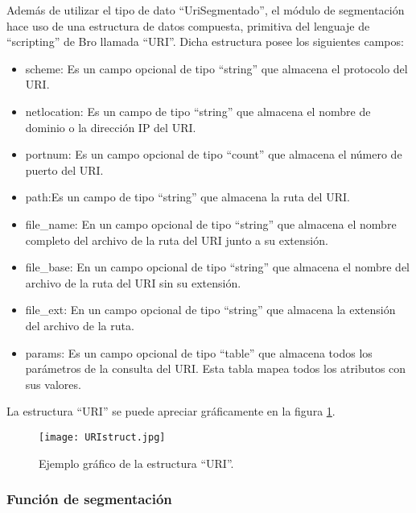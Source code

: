 Además de utilizar el tipo de dato ``UriSegmentado'', el módulo de segmentación hace uso de una estructura de datos compuesta, primitiva del lenguaje de ``scripting'' de Bro llamada  ``URI''. Dicha estructura posee los siguientes campos:

\begin{itemize}
\item scheme: Es un campo opcional de tipo ``string'' que almacena el protocolo del URI.

\item netlocation: Es un campo de tipo ``string'' que almacena el nombre de dominio o la dirección IP del URI.

\item portnum: Es un campo opcional de tipo ``count''  que almacena el número de puerto del URI.
\item path:Es un campo de tipo ``string'' que almacena la ruta del URI.

\item file\_name: En un campo opcional de tipo ``string'' que almacena el nombre completo  del archivo de la ruta del URI junto a su extensión.

\item file\_base: En un campo opcional de tipo ``string'' que almacena el nombre  del archivo de la ruta del URI sin su extensión.

\item file\_ext: En un campo opcional de tipo ``string'' que almacena la extensión del archivo de la ruta.

\item params: Es un campo opcional de tipo ``table'' que almacena todos los parámetros de la consulta del URI. Esta tabla mapea todos los atributos con sus valores.

\end{itemize}

La estructura ``URI'' se puede apreciar gráficamente en la figura \ref{fig:URI}.

\begin{figure}[tb]
\begin{center}
\texttt{[image: URIstruct.jpg]}
\caption{Ejemplo gráfico de la estructura ``URI''.}
\label{fig:URI}
\end{center}
\end{figure}	

\subsubsection{Función de segmentación}

